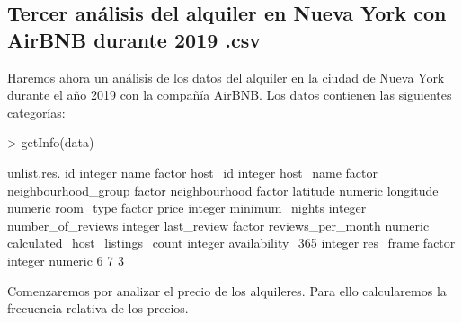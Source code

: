 \documentclass [a4paper] {article}
\begin{document}
\begin{center}
\section{Tercer análisis del alquiler en Nueva York con AirBNB durante 2019 .csv}

Haremos ahora un análisis de los datos del alquiler en la ciudad de Nueva York durante el año 2019 con la compañía AirBNB.
Los datos contienen las siguientes categorías:
\begin{Schunk}
\begin{Sinput}
> getInfo(data)
\end{Sinput}
\begin{Soutput}
                               unlist.res.
id                                 integer
name                                factor
host_id                            integer
host_name                           factor
neighbourhood_group                 factor
neighbourhood                       factor
latitude                           numeric
longitude                          numeric
room_type                           factor
price                              integer
minimum_nights                     integer
number_of_reviews                  integer
last_review                         factor
reviews_per_month                  numeric
calculated_host_listings_count     integer
availability_365                   integer
res_frame
 factor integer numeric 
      6       7       3 
\end{Soutput}
\end{Schunk}
Comenzaremos por analizar el precio de los alquileres.
Para ello calcularemos la frecuencia relativa de los precios.
\begin{Schunk}
\end{Schunk}
\begin{center}

\end{center}
\end{center}
\end{document}
